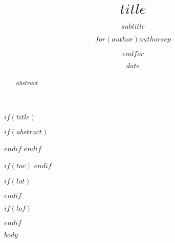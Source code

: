 \documentclass{article}
\title{$title$}
\subtitle{$subtitle$}
\author{$for(author)$$author$$sep$ \and $endfor$}
\date{$date$}
\begin{document}
$if(title)$
    \maketitle
    $if(abstract)$
        \begin{abstract}
            $abstract$
        \end{abstract}
    $endif$
$endif$

$if(toc)$
\setcounter{tocdepth}{$toc-depth$}
\tableofcontents
$endif$

$if(lot)$
\listoftables
$endif$

$if(lof)$
\listoffigures
$endif$

$body$
\end{document}
